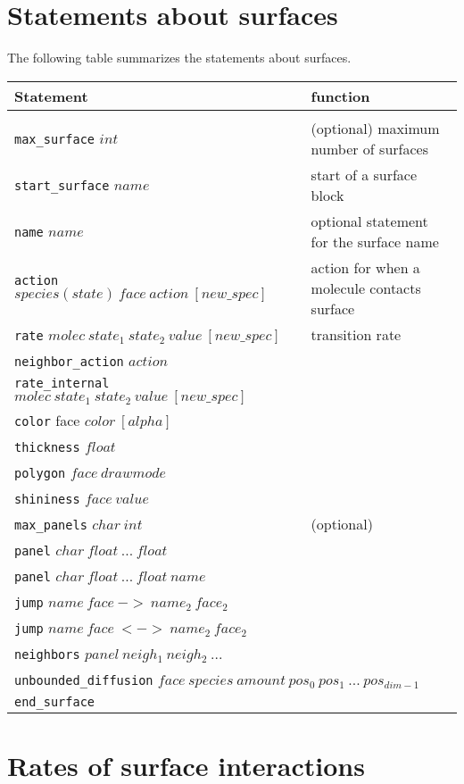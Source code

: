 \documentclass {scrbook}
\newcommand {\ttt} {\texttt}
\begin{document}
\section{Statements about surfaces}

The following table summarizes the statements about surfaces.

\begin{longtable}[c]{ll}
Statement & function\\
\hline\\
\ttt{max\_surface} $int$ & (optional) maximum number of surfaces\\
\ttt{start\_surface} $name$ & start of a surface block\\
\ttt{name} $name$ & optional statement for the surface name\\
\ttt{action} $species(state)\ face\ action\ [new\_spec]$ & action for when a molecule contacts surface\\
\ttt{rate} $molec\ state_1\ state_2\ value\ [new\_spec]$ & transition rate\\
\ttt{neighbor\_action} $action$\\
\ttt{rate\_internal} $molec\ state_1\ state_2\ value\ [new\_spec]$\\
\ttt{color} face $color\ [alpha]$\\
\ttt{thickness} $float$\\
\ttt{polygon} $face\ drawmode$\\
\ttt{shininess} $face\ value$\\
\ttt{max\_panels} $char\ int$ & (optional)\\
\ttt{panel} $char\ float\ ...\ float$\\
\ttt{panel} $char\ float\ ...\ float\ name$\\
\ttt{jump} $name\ face\ ->\ name_2\ face_2$\\
\ttt{jump} $name\ face\ <->\ name_2\ face_2$\\
\ttt{neighbors} $panel\ neigh_1\ neigh_2\ ...$\\
\multicolumn{2}{l}{
\ttt{unbounded\_diffusion} $face\ species\ amount\ pos_0\ pos_1\ ...\ pos_{dim-1}$}\\
\ttt{end\_surface}
\end{longtable}

\section{Rates of surface interactions}
\end{document}
